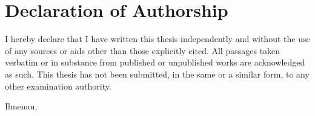\chapter*{Declaration of Authorship}

I hereby declare that I have written this thesis independently and without
the use of any sources or aids other than those explicitly cited. All passages
taken verbatim or in substance from published or unpublished works are
acknowledged as such. This thesis has not been submitted, in the same or a
similar form, to any other examination authority.

\vspace{2cm}

\noindent
Ilmenau, \sadatum \hfill \saauthor
